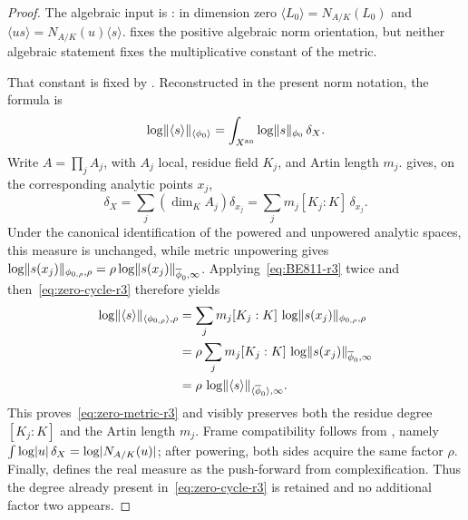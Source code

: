 \begin{proof}
The algebraic input is \cite[Example~8.15]{BE21}: in dimension zero
$\langle L_0\rangle=N_{A/K}(L_0)$ and
$\langle us\rangle=N_{A/K}(u)\langle s\rangle$.
\cite[Proposition~6.1.1(3)]{Ducrot97CubeIntersection} fixes the positive
algebraic norm orientation, but
neither algebraic statement fixes the multiplicative constant of the
metric.

That constant is fixed by
\cite[Theorem~8.16, formula~(8.11)]{BE21}.  Reconstructed in the present
norm notation, the formula is
\begin{equation}
 \log\lVert\langle s\rangle\rVert_{\langle\phi_0\rangle}
 =\int_{X^{\mathrm{an}}}\log\lVert s\rVert_{\phi_0}\,\delta_X.
\label{eq:BE811-r3}
\end{equation}
Write $A=\prod_jA_j$, with $A_j$ local, residue field $K_j$, and Artin
length $m_j$.  \cite[Example~8.2]{BE21} gives, on the corresponding
analytic points $x_j$,
\begin{equation}
 \delta_X=\sum_j(\dim_KA_j)\delta_{x_j}
 =\sum_jm_j[K_j:K]\,\delta_{x_j}.
\label{eq:zero-cycle-r3}
\end{equation}
Under the canonical identification of the powered and unpowered analytic
spaces, this measure is unchanged, while metric unpowering gives
$\log\lVert s(x_j)\rVert_{\phi_{0,\rho},\rho}
 =\rho\log\lVert s(x_j)\rVert_{\overline\phi_0,\infty}$.
Applying~\eqref{eq:BE811-r3} twice and then~\eqref{eq:zero-cycle-r3}
therefore yields
\begin{align*}
 \log\lVert\langle s\rangle\rVert_{\langle\phi_{0,\rho}\rangle,\rho}
 &=\sum_jm_j[K_j:K]\,
   \log\lVert s(x_j)\rVert_{\phi_{0,\rho},\rho}\\
 &=\rho\sum_jm_j[K_j:K]\,
   \log\lVert s(x_j)\rVert_{\overline\phi_0,\infty}\\
 &=\rho\,
   \log\lVert\langle s\rangle\rVert_{\langle\overline\phi_0\rangle,\infty}.
\end{align*}
This proves~\eqref{eq:zero-metric-r3} and visibly preserves both the residue
degree $[K_j:K]$ and the Artin length $m_j$.  Frame compatibility follows
from \cite[Theorem~8.16, formula~(8.12)]{BE21}, namely
$\int\log\lvert u\rvert\,\delta_X=\log\lvert N_{A/K}(u)\rvert$; after powering, both
sides acquire the same factor $\rho$.  Finally,
\cite[Remark~8.1]{BE21} defines the real measure as the push-forward from
complexification.  Thus the
degree already present in~\eqref{eq:zero-cycle-r3} is retained and no
additional factor two appears.
\end{proof}

